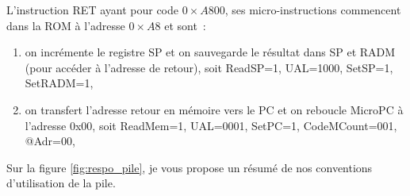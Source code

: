 

L'instruction RET ayant pour code $0\times A800$, ses micro-instructions commencent dans la ROM à l'adresse $0\times A8$ et sont~:
\begin{enumerate}
\item on incrémente le registre SP et on sauvegarde le résultat dans SP et RADM (pour accéder à l'adresse de retour), soit ReadSP=1, UAL=1000, SetSP=1, SetRADM=1, %
\item on transfert l'adresse retour en mémoire vers le PC et on reboucle MicroPC à l'adresse 0x00, soit ReadMem=1, UAL=0001, SetPC=1, CodeMCount=001, @Adr=00, %
\end{enumerate}

Sur la figure \ref{fig:respo_pile}, je vous propose un résumé de nos conventions d'utilisation de la pile. 

